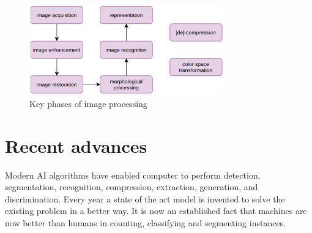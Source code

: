 \begin{figure}[!ht]
    \centering
    \includegraphics[width=0.75\textwidth]{fig/1-2.png}
    \caption{Key phases of image processing}
    \label{fig:keyPhasesOfImageProcessing}
\end{figure}

\section{Recent advances}

Modern AI algorithms have enabled computer to perform detection, segmentation, recognition, compression, extraction, generation, and discrimination. Every year a state of the art model is invented to solve the existing problem in a better way. It is now an established fact that machines are now better than humans in counting, classifying and segmenting instances. 
